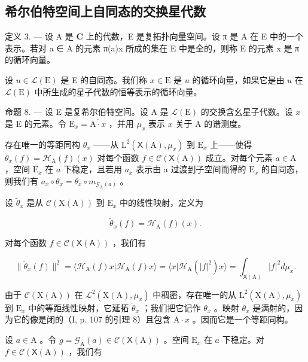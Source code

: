 \subsection{希尔伯特空间上自同态的交换星代数}

定义 3. --- 设 A 是 \(\mathbf{C}\) 上的代数，E 是复拓扑向量空间。设 π 是 A 在 E 中的一个表示。若对 a ∈ A 的元素 π(a)x 所成的集在 E 中是全的，则称 E 的元素 x 是 π 的循环向量。

设 \(u \in \mathcal{L}(\mathrm{E})\) 是 E 的自同态。我们称 \(x \in \mathrm{E}\) 是 \(u\) 的循环向量，如果它是由 \(u\) 在 \(\mathcal{L}(\mathrm{E})\) 中所生成的星子代数的恒等表示的循环向量。

命题 8. --- 设 E 是复希尔伯特空间。设 A 是 \(\mathcal{L}(\mathrm{E})\) 的交换含幺星子代数。设 \(x\) 是 E 的元素。令 \(\mathrm{E}_x = \overline{\mathrm{A} \cdot x}\) ，并用 \(\mu_x\) 表示 \(x\) 关于 A 的谱测度。

存在唯一的等距同构 \(\theta_x\) ——从 \(\mathrm{L}^2 (\mathsf{X}(\mathrm{A}),\mu_x)\) 到 \(\mathrm{E}_x\) 上——使得 \(\theta_{x}(f) = \mathcal{H}_{\mathrm{A}}(f)(x)\) 对每个函数 \(f\in \mathcal{C}(\mathsf{X}(\mathrm{A}))\) 成立。对每个元素 \(a\in \mathrm{A}\) ，空间 \(\mathrm{E}_x\) 在 \(a\) 下稳定，且若用 \(a_{x}\) 表示由 a 过渡到子空间而得的 \(\mathrm{E}_x\) 的自同态，则我们有 \(a_{x}\circ \theta_{x} = \theta_{x}\circ m_{\mathcal{G}_{\mathrm{A}}(a)}\) 。

设 \(\widetilde{\theta}_x\) 是从 \(\mathcal{C}(\mathrm{X(A)})\) 到 \(\mathrm{E}_x\) 中的线性映射，定义为

\[
\widetilde {\theta} _ {x} (f) = \mathcal {H} _ {\mathrm{A}} (f) (x).
\]

对每个函数 \(f \in \mathcal{C}(\mathsf{X}(\mathsf{A}))\) ，我们有

\[
\| \widetilde {\theta} _ {x} (f) \| ^ {2} = \langle \mathcal {H} _ {\mathrm{A}} (f) x | \mathcal {H} _ {\mathrm{A}} (f) x \rangle = \langle x | \mathcal {H} _ {\mathrm{A}} (| f | ^ {2}) x \rangle = \int_ {\mathsf {X} (\mathrm{A})} | f | ^ {2} d \mu_ {x}.
\]

由于 \(\mathcal{C}(\mathrm{X(A)})\) 在 \(\mathcal{L}^2 (\mathrm{X(A)},\mu_x)\) 中稠密，存在唯一的从 \(\mathrm{L}^2 (\mathrm{X(A)},\mu_x)\) 到 \(\mathrm{E}_x\) 中的等距线性映射，它延拓 \(\widetilde{\theta}_x\) ；我们把它记作 \(\theta_{x}\) 。映射 \(\theta_{x}\) 是满射的，因为它的像是闭的（I, p. 107 的引理 8）且包含 \(\mathrm{A}\cdot x\) 。因而它是一个等距同构。

设 \(a \in \mathrm{A}\) 。令 \(g = \mathcal{G}_{\mathrm{A}}(a) \in \mathcal{C}(\mathsf{X}(\mathrm{A}))\) 。空间 \(\mathrm{E}_x\) 在 \(a\) 下稳定。对 \(f \in \mathcal{C}(\mathsf{X}(\mathrm{A}))\) ，我们有

